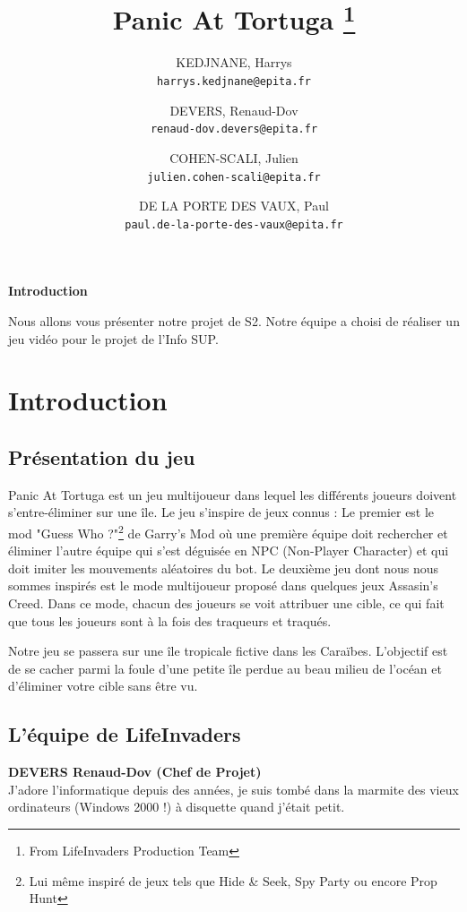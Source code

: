 \documentclass[french, 12pt]{article}
\title{Panic At Tortuga \thanks{From LifeInvaders Production Team}}
\author{
    KEDJNANE, Harrys\\
    \texttt{harrys.kedjnane@epita.fr}
    \and
    DEVERS, Renaud-Dov\\
    \texttt{renaud-dov.devers@epita.fr}
    \and
    COHEN-SCALI, Julien\\
    \texttt{julien.cohen-scali@epita.fr}
    \and
    DE LA PORTE DES VAUX, Paul\\
    \texttt{paul.de-la-porte-des-vaux@epita.fr}
    
}
\begin{document}
\begin{titlepage}
\maketitle
\end{titlepage}

\begin{center}
    \textbf{Introduction}

    Nous allons vous présenter notre projet de S2.
    Notre équipe a choisi de réaliser un jeu vidéo pour le projet de l'Info SUP.
\end{center}

\tableofcontents
\newpage

\section{Introduction}
\subsection{Présentation du jeu}
\begin{flushleft}
    Panic At Tortuga est un jeu multijoueur dans lequel les différents joueurs doivent s'entre-éliminer sur une île.
    Le jeu s'inspire de jeux connus : Le premier est le mod "Guess Who ?"\footnote{Lui même inspiré de jeux tels que Hide \& Seek, Spy Party ou encore Prop Hunt} de Garry's Mod
        où une première équipe doit rechercher et éliminer l'autre équipe qui s'est déguisée en NPC (Non-Player Character) et qui doit imiter les mouvements aléatoires du bot.
    Le deuxième jeu dont nous nous sommes inspirés est le mode multijoueur proposé dans quelques jeux Assasin's Creed.
    Dans ce mode, chacun des joueurs se voit attribuer une cible, ce qui fait que tous les joueurs sont à la fois des traqueurs et traqués.

    Notre jeu se passera sur une île tropicale fictive dans les Caraïbes.
    L'objectif est de se cacher parmi la foule d'une petite île perdue au beau milieu de l'océan et d'éliminer votre cible sans être vu.
\end{flushleft}

\subsection{L'équipe de LifeInvaders}
\textbf{DEVERS Renaud-Dov (Chef de Projet)} \\
J'adore l'informatique depuis des années, je suis tombé dans la marmite des vieux ordinateurs (Windows 2000 !) à disquette quand j'était petit.
\end{document}
